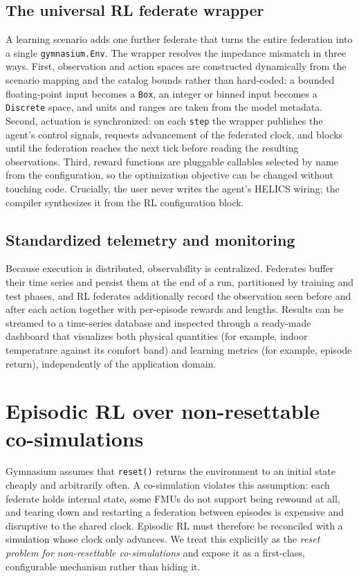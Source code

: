 \documentclass[preprint,12pt]{elsarticle}
\begin{document}
\subsection{The universal RL federate wrapper}
A learning scenario adds one further federate that turns the entire federation into
a single \texttt{gymnasium.Env}. The wrapper resolves the impedance mismatch in
three ways. First, observation and action spaces are constructed dynamically from
the scenario mapping and the catalog bounds rather than hard-coded: a bounded
floating-point input becomes a \texttt{Box}, an integer or binned input becomes a
\texttt{Discrete} space, and units and ranges are taken from the model metadata.
Second, actuation is synchronized: on each \texttt{step} the wrapper publishes the
agent's control signals, requests advancement of the federated clock, and blocks
until the federation reaches the next tick before reading the resulting
observations. Third, reward functions are pluggable callables selected by name from
the configuration, so the optimization objective can be changed without touching
code. Crucially, the user never writes the agent's HELICS wiring; the compiler
synthesizes it from the RL configuration block.

\subsection{Standardized telemetry and monitoring}
Because execution is distributed, observability is centralized. Federates buffer
their time series and persist them at the end of a run, partitioned by training and
test phases, and RL federates additionally record the observation seen before and
after each action together with per-episode rewards and lengths. Results can be
streamed to a time-series database and inspected through a ready-made dashboard
that visualizes both physical quantities (for example, indoor temperature against
its comfort band) and learning metrics (for example, episode return), independently
of the application domain.

\section{Episodic RL over non-resettable co-simulations}\label{sec:reset}
Gymnasium assumes that \texttt{reset()} returns the environment to an initial
state cheaply and arbitrarily often. A co-simulation violates this assumption: each
federate holds internal state, some FMUs do not support being rewound at all, and
tearing down and restarting a federation between episodes is expensive and
disruptive to the shared clock. Episodic RL must therefore be reconciled with a
simulation whose clock only advances. We treat this explicitly as the
\emph{reset problem for non-resettable co-simulations} and expose it as a
first-class, configurable mechanism rather than hiding it.
\end{document}
